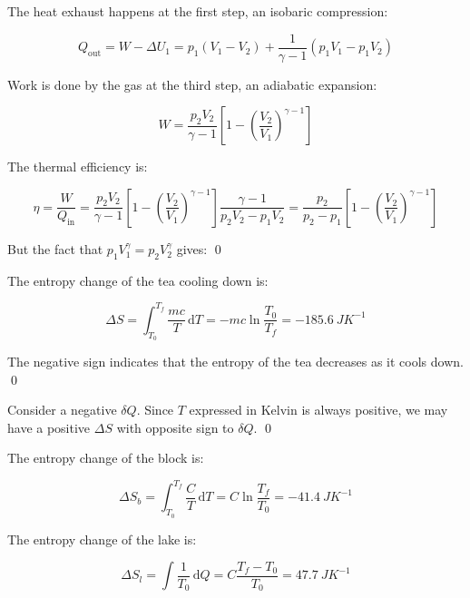 \documentclass[12pt]{article}
\begin{document}
The heat exhaust happens at the first step, an isobaric compression:

\begin{equation}
    Q_{\text{out}} = W - \Delta U_{1} = p_{1}(V_{1} - V_{2}) + \frac{1}{\gamma - 1} (p_{1}V_{1} - p_{1}V_{2})
\end{equation}

Work is done by the gas at the third step, an adiabatic expansion:

\begin{equation}
    W = \frac{p_{2}V_{2}}{\gamma - 1} \left[ 1 - \left( \frac{V_{2}}{V_{1}} \right)^{\gamma - 1} \right]
\end{equation}

The thermal efficiency is:

\begin{equation}
    \eta = \frac{W}{Q_{\text{in}}} = \frac{p_{2}V_{2}}{\gamma - 1} \left[ 1 - \left( \frac{V_{2}}{V_{1}} \right)^{\gamma - 1} \right] \frac{\gamma - 1}{p_{2}V_{2} - p_{1}V_{2}} = \frac{p_{2}}{p_{2} - p_{1}} \left[ 1 - \left( \frac{V_{2}}{V_{1}} \right)^{\gamma - 1} \right]
\end{equation}

But the fact that $p_{1}V_{1}^{\gamma} = p_{2}V_{2}^{\gamma}$ gives:
\qed


The entropy change of the tea cooling down is:

\begin{equation}
    \Delta S = \int_{T_{0}}^{T_{f}} \frac{mc}{T} \, \mathrm{d}T = -mc \ln{\frac{T_{0}}{T_{f}}} = \qty{-185.6}{JK^{-1}}
\end{equation}

The negative sign indicates that the entropy of the tea decreases as it cools down.
\qed


Consider a negative $\delta Q$. Since $T$ expressed in Kelvin is always positive, we may have a positive $\Delta S$ with opposite sign to $\delta Q$.
\qed



The entropy change of the block is:

\begin{equation}
    \Delta S_{b} = \int_{T_{0}}^{T_{f}} \frac{C}{T} \, \mathrm{d}T = C \ln{\frac{T_{f}}{T_{0}}} = \qty{-41.4}{JK^{-1}}
\end{equation}

The entropy change of the lake is:

\begin{equation}
    \Delta S_{l} = \int \frac{1}{T_{0}} \, \mathrm{d}Q = C \frac{T_{f} - T_{0}}{T_{0}} = \qty{47.7}{JK^{-1}}
\end{equation}
\end{document}
